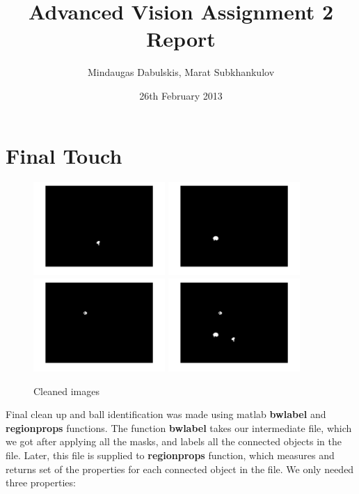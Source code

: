 \documentclass[10pt,a4paper,oneclumn]{article}
\title{Advanced Vision Assignment 2 Report}  %
\author{Mindaugas Dabulskis, Marat Subkhankulov}                      %
\date{26th February 2013}                 %
\begin{document}
\maketitle  %
%

\section{Final Touch}

\begin{figure}[h!]
\centering
  \includegraphics[width=5cm]{cleanedYell.jpg}
  \includegraphics[width=5cm]{cleanGreen.jpg}
  \includegraphics[width=5cm]{cleanRed.jpg}
  \includegraphics[width=5cm]{cleanAll.jpg}
\caption{Cleaned images}
\end{figure}

Final clean up and ball identification was made using matlab \textbf{bwlabel} and \textbf{regionprops} functions. The function \textbf{bwlabel} takes our intermediate file, which we got after applying all the masks, and labels all the connected objects in the file. Later, this file is supplied to \textbf{regionprops} function, which measures and returns set of the properties for each connected object in the file. We only needed three properties:
\end{document}
